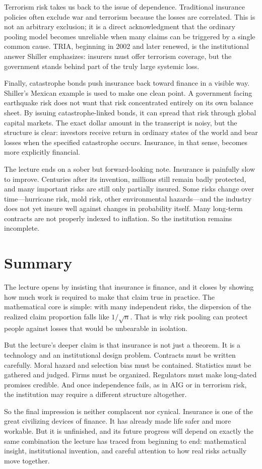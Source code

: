 Terrorism risk takes us back to the issue of dependence. Traditional insurance policies often exclude war and terrorism because the losses are correlated. This is not an arbitrary exclusion; it is a direct acknowledgment that the ordinary pooling model becomes unreliable when many claims can be triggered by a single common cause. TRIA, beginning in 2002 and later renewed, is the institutional answer Shiller emphasizes: insurers must offer terrorism coverage, but the government stands behind part of the truly large systemic loss.

Finally, catastrophe bonds push insurance back toward finance in a visible way. Shiller's Mexican example is used to make one clean point. A government facing earthquake risk does not want that risk concentrated entirely on its own balance sheet. By issuing catastrophe-linked bonds, it can spread that risk through global capital markets. The exact dollar amount in the transcript is noisy, but the structure is clear: investors receive return in ordinary states of the world and bear losses when the specified catastrophe occurs. Insurance, in that sense, becomes more explicitly financial.

The lecture ends on a sober but forward-looking note. Insurance is painfully slow to improve. Centuries after its invention, millions still remain badly protected, and many important risks are still only partially insured. Some risks change over time---hurricane risk, mold risk, other environmental hazards---and the industry does not yet insure well against changes in probability itself. Many long-term contracts are not properly indexed to inflation. So the institution remains incomplete.

\section{Summary}

The lecture opens by insisting that insurance is finance, and it closes by showing how much work is required to make that claim true in practice. The mathematical core is simple: with many independent risks, the dispersion of the realized claim proportion falls like \(1/\sqrt{n}\). That is why risk pooling can protect people against losses that would be unbearable in isolation.

But the lecture's deeper claim is that insurance is not just a theorem. It is a technology and an institutional design problem. Contracts must be written carefully. Moral hazard and selection bias must be contained. Statistics must be gathered and judged. Firms must be organized. Regulators must make long-dated promises credible. And once independence fails, as in AIG or in terrorism risk, the institution may require a different structure altogether.

So the final impression is neither complacent nor cynical. Insurance is one of the great civilizing devices of finance. It has already made life safer and more workable. But it is unfinished, and its future progress will depend on exactly the same combination the lecture has traced from beginning to end: mathematical insight, institutional invention, and careful attention to how real risks actually move together.